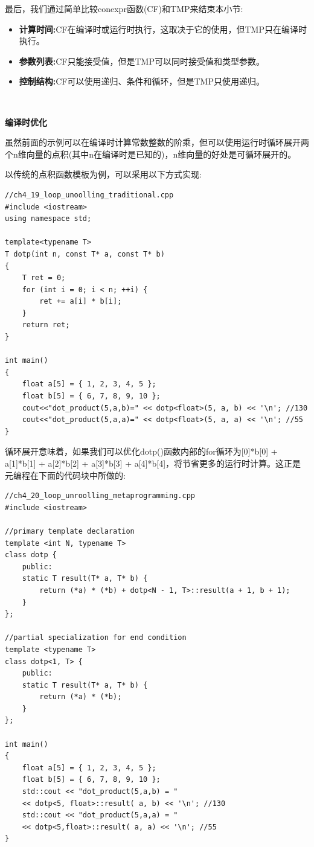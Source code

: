 最后，我们通过简单比较conexpr函数(CF)和TMP来结束本小节: \par

\begin{itemize}
	\item \textbf{计算时间:}CF在编译时或运行时执行，这取决于它的使用，但TMP只在编译时执行。
	\item \textbf{参数列表:}CF只能接受值，但是TMP可以同时接受值和类型参数。
	\item \textbf{控制结构:}CF可以使用递归、条件和循环，但是TMP只使用递归。
\end{itemize}

\noindent\textbf{}\ \par
\textbf{编译时优化} \ \par
虽然前面的示例可以在编译时计算常数整数的阶乘，但可以使用运行时循环展开两个n维向量的点积(其中n在编译时是已知的)，n维向量的好处是可循环展开的。 \par
以传统的点积函数模板为例，可以采用以下方式实现: \par

\begin{lstlisting}[caption={}]
//ch4_19_loop_unoolling_traditional.cpp
#include <iostream>
using namespace std;

template<typename T>
T dotp(int n, const T* a, const T* b)
{
	T ret = 0;
	for (int i = 0; i < n; ++i) {
		ret += a[i] * b[i];
	}
	return ret;
}

int main()
{
	float a[5] = { 1, 2, 3, 4, 5 };
	float b[5] = { 6, 7, 8, 9, 10 };
	cout<<"dot_product(5,a,b)=" << dotp<float>(5, a, b) << '\n'; //130
	cout<<"dot_product(5,a,a)=" << dotp<float>(5, a, a) << '\n'; //55
}
\end{lstlisting}

循环展开意味着，如果我们可以优化dotp()函数内部的for循环为[0]*b[0] + a[1]*b[1] + a[2]*b[2] + a[3]*b[3] + a[4]*b[4]，将节省更多的运行时计算。这正是元编程在下面的代码块中所做的:\par

\begin{lstlisting}[caption={}]
//ch4_20_loop_unroolling_metaprogramming.cpp
#include <iostream>

//primary template declaration
template <int N, typename T>
class dotp {
	public:
	static T result(T* a, T* b) {
		return (*a) * (*b) + dotp<N - 1, T>::result(a + 1, b + 1);
	}
};

//partial specialization for end condition
template <typename T>
class dotp<1, T> {
	public:
	static T result(T* a, T* b) {
		return (*a) * (*b);
	}
};

int main()
{
	float a[5] = { 1, 2, 3, 4, 5 };
	float b[5] = { 6, 7, 8, 9, 10 };
	std::cout << "dot_product(5,a,b) = "
	<< dotp<5, float>::result( a, b) << '\n'; //130
	std::cout << "dot_product(5,a,a) = "
	<< dotp<5,float>::result( a, a) << '\n'; //55
}
\end{lstlisting}

